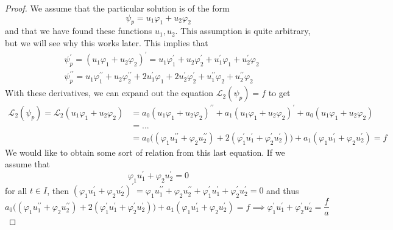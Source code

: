 \documentclass{article}
\begin{document}
      \begin{proof}
      We assume that the particular solution is of the form 
      \begin{equation}
        \psi_p = u_1 \varphi_1 + u_2 \varphi_2
      \end{equation}
      and that we have found these functions $u_1, u_2$. This assumption is quite arbitrary, but we will see why this works later. This implies that
      \begin{align*}
          &\psi_p^\prime = (u_1 \varphi_1 + u_2 \varphi_2)^\prime  = u_1 \varphi_1^\prime + u_2 \varphi_2^\prime + u_1^\prime \varphi_1 + u_2^\prime \varphi_2 \\
          & \psi_p^{\prime \prime} = u_1 \varphi_1^{\prime \prime} + u_2 \varphi_2^{\prime \prime} + 2 u_1^\prime \varphi_1 + 2 u_2^\prime \varphi_2^\prime + u_1^{\prime \prime} \varphi_2 + u_2^{\prime \prime} \varphi_2
      \end{align*}
      With these derivatives, we can expand out the equation $\mathcal{L}_2 (\psi_p) = f$ to get
      \begin{align*}
          \mathcal{L}_2(\psi_p) = \mathcal{L}_2 (u_1 \varphi_1 + u_2 \varphi_2) & = a_0 (u_1 \varphi_1 + u_2 \varphi_2)^{\prime\prime} + a_1 (u_1 \varphi_1 + u_2 \varphi_2)^{\prime} + a_0 (u_1 \varphi_1 + u_2 \varphi_2) \\
          & = ... \\
          & = a_0 \big( (\varphi_1 u_1^{\prime\prime} + \varphi_2 u_2^{\prime \prime}) + 2(\varphi_1^\prime u_1^\prime + \varphi_2^\prime u_2^\prime)\big) + a_1 (\varphi_1 u_1^\prime + \varphi_2 u_2^\prime) = f
      \end{align*}
      We would like to obtain some sort of relation from this last equation. If we assume that 
      \begin{equation}
        \varphi_1 u_1^\prime + \varphi_2 u_2^\prime = 0
      \end{equation}
      for all $t \in I$, then $(\varphi_1 u_1^\prime + \varphi_2 u_2^\prime)^\prime = \varphi_1 u_1^{\prime\prime} + \varphi_2 u_2^{\prime\prime} + \varphi_1^\prime u_1^{\prime} + \varphi_2^\prime u_2^{\prime} = 0$ and thus
      \begin{equation}
        a_0 \big( (\varphi_1 u_1^{\prime\prime} + \varphi_2 u_2^{\prime \prime}) + 2(\varphi_1^\prime u_1^\prime + \varphi_2^\prime u_2^\prime)\big) + a_1 (\varphi_1 u_1^\prime + \varphi_2 u_2^\prime) = f \implies \varphi_1^\prime u_1^\prime + \varphi_2^\prime u_2^\prime = \frac{f}{a}
      \end{equation}

\end{proof}
\end{document}
